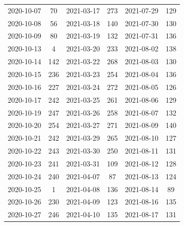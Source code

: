 \begin{table}[ht]
\begin{tabular}{|cc|cc|cc}
  2020-10-07 & 70 & 2021-03-17 & 273 & 2021-07-29 & 129 \\ 
  2020-10-08 & 56 & 2021-03-18 & 140 & 2021-07-30 & 130 \\ 
  2020-10-09 & 80 & 2021-03-19 & 132 & 2021-07-31 & 136 \\ 
  2020-10-13 & 4 & 2021-03-20 & 233 & 2021-08-02 & 138 \\ 
  2020-10-14 & 142 & 2021-03-22 & 268 & 2021-08-03 & 130 \\ 
  2020-10-15 & 236 & 2021-03-23 & 254 & 2021-08-04 & 136 \\ 
  2020-10-16 & 227 & 2021-03-24 & 272 & 2021-08-05 & 126 \\ 
  2020-10-17 & 242 & 2021-03-25 & 261 & 2021-08-06 & 129 \\ 
  2020-10-19 & 247 & 2021-03-26 & 258 & 2021-08-07 & 132 \\ 
  2020-10-20 & 254 & 2021-03-27 & 271 & 2021-08-09 & 140 \\ 
  2020-10-21 & 242 & 2021-03-29 & 265 & 2021-08-10 & 127 \\ 
  2020-10-22 & 243 & 2021-03-30 & 250 & 2021-08-11 & 131 \\ 
  2020-10-23 & 241 & 2021-03-31 & 109 & 2021-08-12 & 128 \\ 
  2020-10-24 & 240 & 2021-04-07 & 87 & 2021-08-13 & 124 \\ 
  2020-10-25 & 1 & 2021-04-08 & 136 & 2021-08-14 & 89 \\ 
  2020-10-26 & 230 & 2021-04-09 & 123 & 2021-08-16 & 135 \\ 
  2020-10-27 & 246 & 2021-04-10 & 135 & 2021-08-17 & 131 \\ 
   \hline
\end{tabular}
\end{table}
